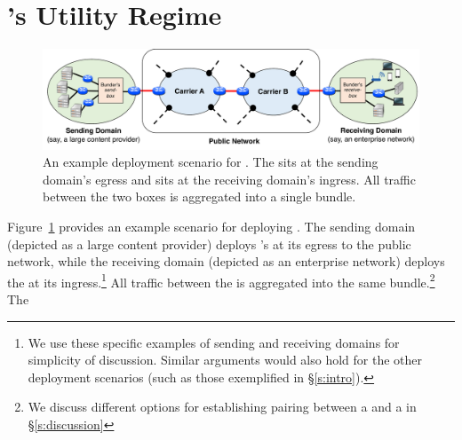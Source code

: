 \section{\name's Utility Regime}

\label{s:deploy}

\begin{figure}
    \centering
    \includegraphics[width=\textwidth]{img/deployment-arch.pdf}
    \caption{An example deployment scenario for \name. 
    The \inbox sits at the sending domain's egress and \outbox sits at the receiving domain's ingress. All traffic between the two boxes is aggregated into a single bundle. 
    }\label{fig:deploy:arch}
\end{figure}


Figure~\ref{fig:deploy:arch}  provides an example scenario for deploying \name. The sending domain (depicted as a large content provider) deploys \name's \inbox at its egress to the public network, while the receiving domain (depicted as an enterprise network) deploys the \outbox at its ingress.\footnote{We use these specific examples of sending and receiving domains for simplicity of discussion. Similar arguments would also hold for the other deployment scenarios (such as those exemplified in \S\ref{s:intro}).} All traffic between the \pair is aggregated into the same bundle.\footnote{We discuss different options for establishing pairing between a \inbox and a \outbox in \S\ref{s:discussion}} The \inbox {} 

